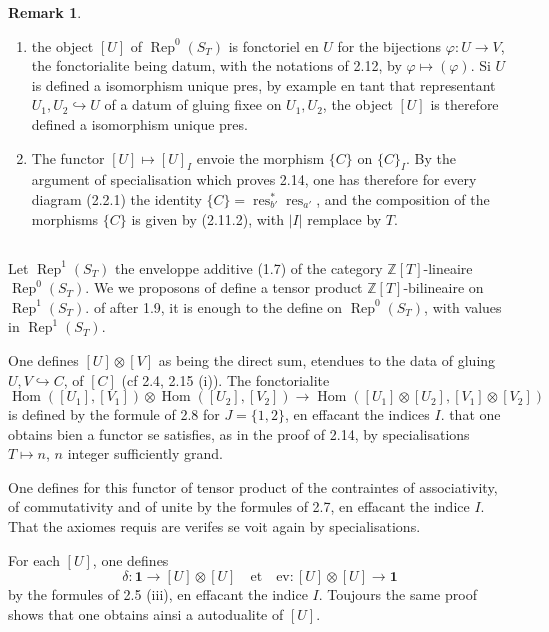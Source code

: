 \documentclass[11pt,a4paper]{article}
\theoremstyle{plain}
\theoremstyle{definition}
\newtheorem{remark}[theorem]{Remark}
\DeclareMathOperator{\Hom}{Hom}
\DeclareMathOperator{\Rep}{Rep}
\DeclareMathOperator{\res}{res}
\newcommand{\Z}{\mathbb{Z}}
\newcommand{\inj}{\hookrightarrow}
\newcommand{\ev}{\mathrm{ev}}
\begin{document}
\begin{remark}
\begin{enumerate}[label=(\roman*)]
\item the object $[U]$ of $\Rep^0(S_T)$ is fonctoriel en $U$ for the bijections $\varphi : U \to V$, the fonctorialite being datum, with the notations of 2.12, by $\varphi \mapsto (\varphi)$. Si $U$ is defined a isomorphism unique pres, by example en tant that representant $U_1, U_2 \inj U$ of a datum of gluing fixee on $U_1, U_2$, the object $[U]$ is therefore defined a isomorphism unique pres.

\item The functor $[U] \mapsto [U]_I$ envoie the morphism $\{C\}$ on $\{C\}_I$. By the argument of specialisation which proves 2.14, one has therefore for every diagram (2.2.1) the identity $\{C\} = \res^*_{b'} \res_{a'}$, and the composition of the morphisms $\{C\}$ is given by (2.11.2), with $|I|$ remplace by $T$.
\end{enumerate}
\end{remark}

\subsection{}
Let $\Rep^1(S_T)$ the enveloppe additive (1.7) of the category $\Z[T]$-lineaire $\Rep^0(S_T)$. We we proposons of define a tensor product $\Z[T]$-bilineaire on $\Rep^1(S_T)$. of after 1.9, it is enough to the define on $\Rep^0(S_T)$, with values in $\Rep^1(S_T)$.

One defines $[U] \otimes [V]$ as being the direct sum, etendues to the data of gluing $U, V \inj C$, of $[C]$ (cf 2.4, 2.15 (i)). The fonctorialite
\[
\Hom([U_1], [V_1]) \otimes \Hom([U_2], [V_2]) \to \Hom([U_1] \otimes [U_2], [V_1] \otimes [V_2])
\]
is defined by the formule of 2.8 for $J = \{1, 2\}$, en effacant the indices $I$. that one obtains bien a functor se satisfies, as in the proof of 2.14, by specialisations $T \mapsto n$, $n$ integer sufficiently grand.

One defines for this functor of tensor product of the contraintes of associativity, of commutativity and of unite by the formules of 2.7, en effacant the indice $I$. That the axiomes requis are verifes se voit again by specialisations.

For each $[U]$, one defines
\begin{equation}
\delta : \mathbf{1} \to [U] \otimes [U] \quad \text{et} \quad \ev : [U] \otimes [U] \to \mathbf{1} \tag{2.16.1}
\end{equation}
by the formules of 2.5 (iii), en effacant the indice $I$. Toujours the same proof shows that one obtains ainsi a autodualite of $[U]$.
\end{document}
